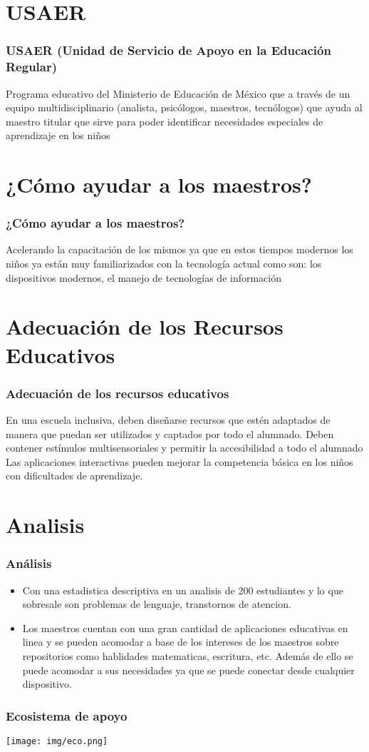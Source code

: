 \documentclass[11pt]{beamer}
\begin{document}
\section{USAER}
\begin{frame}
\frametitle{USAER (Unidad de Servicio de Apoyo en la Educación Regular)}
Programa educativo del Ministerio de Educación de México que a través de un equipo multidisciplinario (analista, psicólogos, maestros, tecnólogos) que ayuda al maestro titular que sirve para poder identificar necesidades especiales de aprendizaje en los niños
\end{frame}

\section{¿Cómo ayudar a los maestros?}
\begin{frame}
\frametitle{¿Cómo ayudar a los maestros?}
Acelerando la capacitación de los mismos ya que en estos tiempos modernos los niños ya están muy familiarizados con la tecnología actual como son: los dispositivos modernos, el manejo de tecnologías de información
\end{frame}

\section{Adecuación de los Recursos Educativos}
\begin{frame}
\frametitle{Adecuación de los recursos educativos}
En una escuela inclusiva, deben diseñarse recursos que estén adaptados de manera que puedan ser utilizados y captados por todo el alumnado.
Deben contener estímulos multisensoriales y permitir la accesibilidad a todo el alumnado
Las aplicaciones interactivas pueden mejorar la competencia básica en los niños con dificultades de aprendizaje.

\end{frame}

\section{Analisis}
\begin{frame}
\frametitle{Análisis}
\begin{itemize}
\item Con una estadistica descriptiva en un analisis de 200 estudiantes y lo que sobresale son problemas de lenguaje, transtornos de atencion.
\item Los maestros cuentan con una gran cantidad de aplicaciones educativas en linea y se pueden acomodar a base de los intereses de los maestros sobre repositorios como hablidades matematicas, escritura, etc. 
Además de ello se puede acomodar a sus necesidades ya que se puede conectar desde cualquier dispositivo.
\end{itemize}
\end{frame}
\begin{frame}
\frametitle{Ecosistema de apoyo}

{\texttt{[image: img/eco.png]}}


\end{frame}
\end{document}
